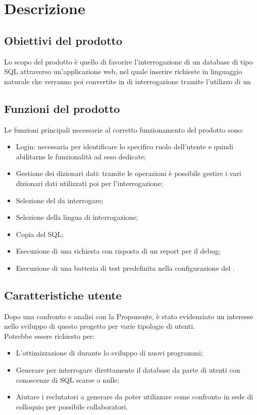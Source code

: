 \section{Descrizione}

\subsection{Obiettivi del prodotto}
Lo scopo del prodotto è quello di favorire l’interrogazione di un database di tipo SQL attraverso un’applicazione web, nel quale inserire richieste in linguaggio naturale che verranno poi convertite in  di interrogazione tramite l’utilizzo di un 

\subsection{Funzioni del prodotto}
Le funzioni principali necessarie al corretto funzionamento del prodotto sono:
\begin{itemize}
  \item Login: necessaria per identificare lo specifico ruolo dell’utente e quindi abilitarne le funzionalità ad esso dedicate;
  \item Gestione dei dizionari dati: tramite le operazioni  è possibile gestire i vari dizionari dati utilizzati poi per l’interrogazione;
  \item Selezione del  da interrogare;
  \item Selezione della lingua di interrogazione;
  \item Copia del  SQL;
  \item Esecuzione di una richiesta con risposta di un report per il debug;
  \item Esecuzione di una batteria di test predefinita nella configurazione del .
\end{itemize}

\subsection{Caratteristiche utente}
Dopo una confronto e analisi con la Proponente, è stato evidenziato un interesse nello sviluppo di questo progetto per varie tipologie di utenti.\\
Potrebbe essere richiesto per:
\begin{itemize}
  \item L'ottimizzazione di  durante lo sviluppo di nuovi programmi;
  \item Generare  per interrogare direttamente il database da parte di utenti con conoscenze di SQL scarse o nulle;
  \item Aiutare i reclutatori a generare  da poter utilizzare come confronto in sede di colloquio per possibile collaboratori.
\end{itemize}